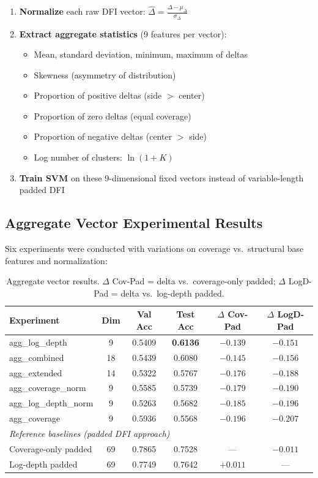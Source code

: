 \documentclass[12pt,a4paper]{article}
\begin{document}
\begin{enumerate}
\item \textbf{Normalize} each raw DFI vector: $\hat{\Delta} = \frac{\Delta - \mu_\Delta}{\sigma_\Delta}$

\item \textbf{Extract aggregate statistics} (9 features per vector):
\begin{itemize}
\item Mean, standard deviation, minimum, maximum of deltas
\item Skewness (asymmetry of distribution)
\item Proportion of positive deltas (side $>$ center)
\item Proportion of zero deltas (equal coverage)
\item Proportion of negative deltas (center $>$ side)
\item Log number of clusters: $\ln(1 + K)$
\end{itemize}

\item \textbf{Train SVM} on these 9-dimensional fixed vectors instead of variable-length padded DFI
\end{enumerate}

\subsection{Aggregate Vector Experimental Results}

Six experiments were conducted with variations on coverage vs.\ structural base features
and normalization:

\begin{table}[h]
\centering
\small
\begin{tabular}{lccccc}
\hline
\textbf{Experiment} & \textbf{Dim} & \textbf{Val Acc} & \textbf{Test Acc} & \textbf{$\Delta$ Cov-Pad} & \textbf{$\Delta$ LogD-Pad} \\
\hline
agg\_log\_depth & 9 & 0.5409 & \textbf{0.6136} & $-0.139$ & $-0.151$ \\
agg\_combined & 18 & 0.5439 & 0.6080 & $-0.145$ & $-0.156$ \\
agg\_extended & 14 & 0.5322 & 0.5767 & $-0.176$ & $-0.188$ \\
agg\_coverage\_norm & 9 & 0.5585 & 0.5739 & $-0.179$ & $-0.190$ \\
agg\_log\_depth\_norm & 9 & 0.5263 & 0.5682 & $-0.185$ & $-0.196$ \\
agg\_coverage & 9 & 0.5936 & 0.5568 & $-0.196$ & $-0.207$ \\
\hline
\multicolumn{6}{l}{\textit{Reference baselines (padded DFI approach)}} \\
Coverage-only padded & 69 & 0.7865 & 0.7528 & --- & $-0.011$ \\
Log-depth padded & 69 & 0.7749 & 0.7642 & $+0.011$ & --- \\
\hline
\end{tabular}
\caption{Aggregate vector results. $\Delta$ Cov-Pad = delta vs.\ coverage-only padded; $\Delta$ LogD-Pad = delta vs.\ log-depth padded.}
\label{tab:aggregate_results}
\end{table}
\end{document}
